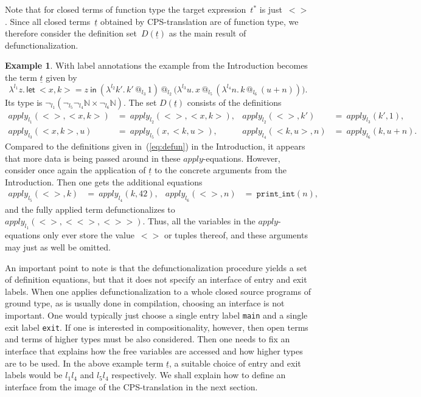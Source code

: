 \documentclass{LMCS}
\makeatletter
\theoremstyle{definition}
\newtheorem{example}[thm]{Example}
\theoremstyle{plain}
\newcommand{\kw}[1]{\mathsf{#1}}
\newcommand{\NN}{\mathbb{N}}
\newcommand{\Capply}{\textit{apply}}
\newcommand{\tappl}[3]{{#1} {\,@_{#2}\,} {#3}}
\newcommand{\tlet}[3]{\kw{let}\ #2=#1\ \kw{in}\ #3}
\newcommand{\cps}[1]{\underline{#1}}
\makeatother
\begin{document}
Note that for closed terms of function type 
the target expression~$t^*$ is just~$<>$. Since 
all closed terms~$\cps t$ obtained by CPS-translation are of function
type, we therefore consider the definition set~$D(\cps t)$ as the
main result of defunctionalization.  

\begin{example}
\label{ex:defun}
With label annotations the example from the Introduction becomes the term
$\cps t$ given by
\[
  \lambda^{l_1} z.\, \tlet {z} {<x,k>} {
\tappl {(\lambda^{l_2}k'.\, \tappl {k'} {l_3} 1)} {l_2} {(\lambda^{l_3} u.\, \tappl x {l_5} {(\lambda^{l_4} n.\, \tappl k {l_6} {(u+n)}))}}}.
\]
Its type is ${\neg_{l_1}(\neg_{l_5} \neg_{l_4} \NN \times \neg_{l_6} \NN)}$. 
The set $D(\cps t)$
consists of the definitions
\begin{align*}
  \Capply_{l_1}(<>, <x,k>) &=\  \Capply_{l_2}(<>,<x,k>) ,
  &
  \Capply_{l_2}(<>, k') &=\  \Capply_{l_3}(k', 1) ,
  \\
  \Capply_{l_3}(<x,k>, u) &=\  \Capply_{l_5}(x, <k,u>) ,
  &
  \Capply_{l_4}(<k,u>, n) &=\ \Capply_{l_6}(k, u+n) .
\end{align*}
Compared to the definitions given in~(\ref{eq:defun}) in the Introduction, it appears that more
data is being passed around in these $\Capply$-equations.
However, consider once again the application of $\cps t$ to the
concrete arguments from the Introduction. Then one 
gets the additional
equations 
\begin{align*}
  \Capply_{l_5}(<>, k) &=\  \Capply_{l_4}(k, 42) ,
  &
  \Capply_{l_6}(<>, n) &=\ \texttt{print\_int}(n),
\end{align*}
and the fully applied term defunctionalizes to $\Capply_{l_1}(<>, <<>, <>>)$.
Thus, all the variables in the $\Capply$-equations only
ever store the value~$<>$ or tuples thereof, and these arguments 
may just as well be omitted.
\end{example}

An important point to note is that the defunctionalization procedure yields a set of
definition equations, but that it does not specify an interface of
entry and exit labels.
When one applies defunctionalization to 
a whole closed source programs of ground type, as is usually done in compilation,
choosing an interface is not important. One would
typically just choose a single entry label \texttt{main}
and a single exit label \texttt{exit}.
If one is interested in compositionality, however,
then open terms and 
terms of higher types must be also considered. 
Then one needs to fix an interface that explains how the 
free variables are accessed and how higher types are to be used.
In the above example term $\underline t$, a suitable choice of entry and
exit labels would be $l_1 l_4$ and $l_5 l_4$ respectively.
We shall explain how to define an interface from the
image of the CPS-translation in the next section.
\end{document}
